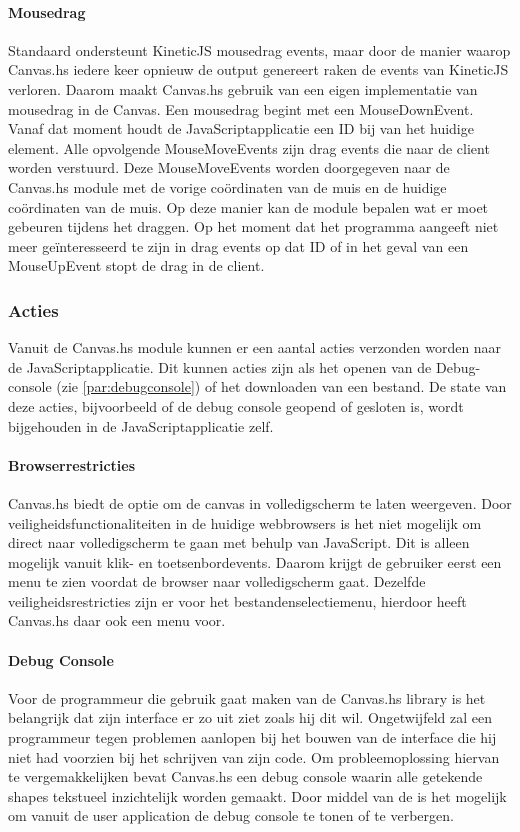 \paragraph{Mousedrag}
Standaard ondersteunt KineticJS mousedrag events, maar door de manier waarop Canvas.hs iedere keer opnieuw de output genereert raken de events van KineticJS verloren. Daarom maakt Canvas.hs gebruik van een eigen implementatie van mousedrag in de Canvas. Een mousedrag begint met een MouseDownEvent. Vanaf dat moment houdt de JavaScriptapplicatie een ID bij van het huidige element. Alle opvolgende MouseMoveEvents zijn drag events die naar de client worden verstuurd. Deze MouseMoveEvents worden doorgegeven naar de Canvas.hs module met de vorige coördinaten van de muis en de huidige coördinaten van de muis.
Op deze manier kan de module bepalen wat er moet gebeuren tijdens het draggen. Op het moment dat het programma aangeeft niet meer ge\"interesseerd te zijn in drag events op dat ID of in het geval van een MouseUpEvent stopt de drag in de client.

\subsubsection{Acties}
Vanuit de Canvas.hs module kunnen er een aantal acties verzonden worden naar de JavaScriptapplicatie. Dit kunnen acties zijn als het openen van de Debug-console (zie \autoref{par:debugconsole}) of het downloaden van een bestand. De state van deze acties, bijvoorbeeld of de debug console geopend of gesloten is, wordt bijgehouden in de JavaScriptapplicatie zelf.

\paragraph{Browserrestricties}
Canvas.hs biedt de optie om de canvas in volledigscherm te laten weergeven. Door veiligheidsfunctionaliteiten in de huidige webbrowsers is het niet mogelijk om direct naar volledigscherm te gaan met behulp van JavaScript. Dit is alleen mogelijk vanuit klik- en toetsenbordevents. Daarom krijgt de gebruiker eerst een menu te zien voordat de browser naar volledigscherm gaat. Dezelfde veiligheidsrestricties zijn er voor het bestandenselectiemenu, hierdoor heeft Canvas.hs daar ook een menu voor.

\paragraph{Debug Console} \label{par:debugconsole}
Voor de programmeur die gebruik gaat maken van de Canvas.hs library is het belangrijk dat zijn interface er zo uit ziet zoals hij dit wil. Ongetwijfeld zal een programmeur tegen problemen aanlopen bij het bouwen van de interface die hij niet had voorzien bij het schrijven van zijn code. Om probleemoplossing hiervan te vergemakkelijken bevat Canvas.hs een debug console waarin alle getekende shapes tekstueel inzichtelijk worden gemaakt. Door middel van de  is het mogelijk om vanuit de user application de debug console te tonen of te verbergen.
